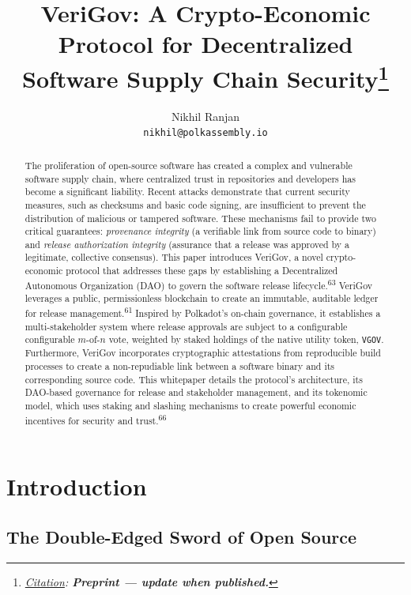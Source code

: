 \documentclass{article}
\title{VeriGov: A Crypto-Economic Protocol for Decentralized Software Supply Chain Security\thanks{\textit{\underline{Citation}: \textbf{Preprint --- update when published.}}}}
\author{
  Nikhil Ranjan \\
  \texttt{nikhil@polkassembly.io} \\
}
\begin{document}
\maketitle

\begin{abstract}
The proliferation of open-source software has created a complex and vulnerable software supply chain, where centralized trust in repositories and developers has become a significant liability. Recent attacks demonstrate that current security measures, such as checksums and basic code signing, are insufficient to prevent the distribution of malicious or tampered software. These mechanisms fail to provide two critical guarantees: \emph{provenance integrity} (a verifiable link from source code to binary) and \emph{release authorization integrity} (assurance that a release was approved by a legitimate, collective consensus). This paper introduces VeriGov, a novel crypto-economic protocol that addresses these gaps by establishing a Decentralized Autonomous Organization (DAO) to govern the software release lifecycle.\textsuperscript{63} VeriGov leverages a public, permissionless blockchain to create an immutable, auditable ledger for release management.\textsuperscript{61} Inspired by Polkadot's on-chain governance, it establishes a multi-stakeholder system where release approvals are subject to a configurable configurable $m$-of-$n$ vote, weighted by staked holdings of the native utility token, \lstinline{VGOV}. Furthermore, VeriGov incorporates cryptographic attestations from reproducible build processes to create a non-repudiable link between a software binary and its corresponding source code. This whitepaper details the protocol's architecture, its DAO-based governance for release and stakeholder management, and its tokenomic model, which uses staking and slashing mechanisms to create powerful economic incentives for security and trust.\textsuperscript{66}
\end{abstract}

\section{Introduction}
\label{sec:introduction}

\subsection{The Double-Edged Sword of Open Source}
\end{document}
